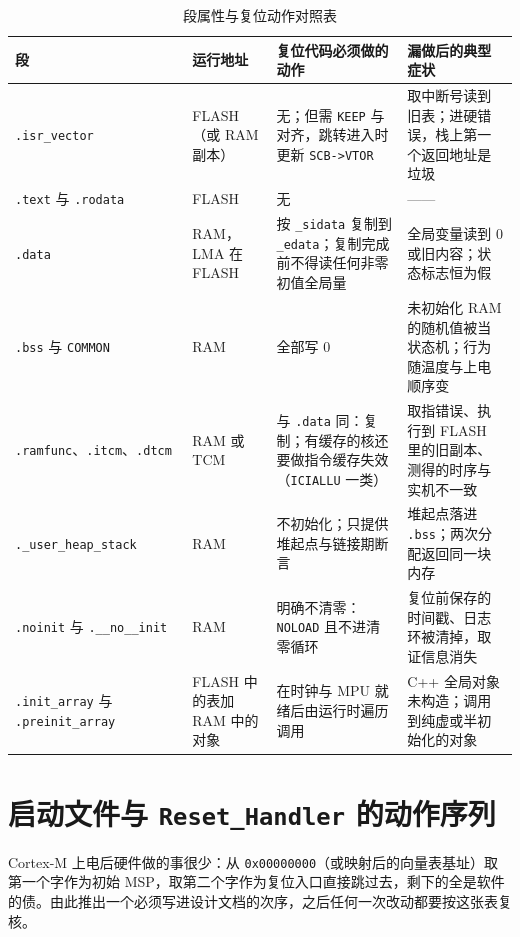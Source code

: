 \documentclass[12pt,a4paper,fontset=fandol]{ctexbook}
\newcommand{\Tp}[1]{\texttt{#1}}
\newcommand{\Bk}{\discretionary{}{}{}}
\begin{document}
\begin{table}[htbp]
\centering
\caption{段属性与复位动作对照表}
\label{tab:ch01-sections}
\begin{tabular}{>{\raggedright\arraybackslash}p{}
                >{\raggedright\arraybackslash}p{}
                >{\raggedright\arraybackslash}p{}
                >{\raggedright\arraybackslash}p{}}
\toprule
段 & 运行地址 & 复位代码必须做的动作 & 漏做后的典型症状 \\
\midrule
\Tp{.isr\_vector} & FLASH（或 RAM 副本） & 无；但需 \Tp{KEEP} 与对齐，跳转进入时更新 \Tp{SCB->VTOR} & 取中断号读到旧表；进硬错误，栈上第一个返回地址是垃圾 \\
\Tp{.text} 与 \Tp{.rodata} & FLASH & 无 & —— \\
\Tp{.data} & RAM，LMA 在 FLASH & 按 \Tp{\_sidata} 复制到 \Tp{\_edata}；复制完成前不得读任何非零初值全局量 & 全局变量读到 0 或旧内容；状态标志恒为假 \\
\Tp{.bss} 与 \Tp{COMMON} & RAM & 全部写 0 & 未初始化 RAM 的随机值被当状态机；行为随温度与上电顺序变 \\
\Tp{.ramfunc}、\Tp{.itcm}、\Tp{.dtcm} & RAM 或 TCM & 与 \Tp{.data} 同：复制；有缓存的核还要做指令缓存失效（\Tp{ICIALLU} 一类） & 取指错误、执行到 FLASH 里的旧副本、测得的时序与实机不一致 \\
\Tp{.\_{\Bk}user\_{\Bk}heap\_{\Bk}stack} & RAM & 不初始化；只提供堆起点与链接期断言 & 堆起点落进 \Tp{.bss}；两次分配返回同一块内存 \\
\Tp{.noinit} 与 \Tp{.\_\_no\_\_init} & RAM & 明确不清零：\Tp{NOLOAD} 且不进清零循环 & 复位前保存的时间戳、日志环被清掉，取证信息消失 \\
\Tp{.init\_{\Bk}array} 与 \Tp{.preinit\_{\Bk}array} & FLASH 中的表加 RAM 中的对象 & 在时钟与 MPU 就绪后由运行时遍历调用 & C++ 全局对象未构造；调用到纯虚或半初始化的对象 \\
\bottomrule
\end{tabular}
\end{table}

\section{启动文件与 \Tp{Reset\_Handler} 的动作序列}

\label{sec:ch01-startup}

Cortex-M 上电后硬件做的事很少：从 \Tp{0x00000000}（或映射后的向量表基址）取第一个字作为初始 MSP，取第二个字作为复位入口直接跳过去，剩下的全是软件的债。由此推出一个必须写进设计文档的次序，之后任何一次改动都要按这张表复核。
\end{document}
